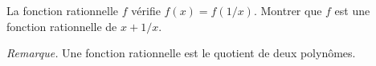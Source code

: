 La fonction rationnelle $f$ vérifie $f(x) = f(1/x)$. Montrer que $f$ est une fonction rationnelle de $x + 1/x$.

\emph{Remarque.} Une fonction rationnelle est le quotient de deux polynômes.
